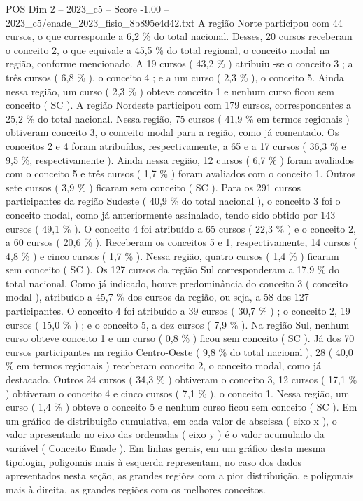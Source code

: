 \begin{textsample}{POS Dim 2 – 2023\_c5 – Score -1.00 – 2023\_c5/enade\_2023\_fisio\_8b895e4d42.txt}
A região Norte participou com 44 cursos, o que corresponde a 6,2 \% do total nacional.
Desses, 20 cursos receberam o conceito 2, o que equivale a 45,5 \% do total regional, o conceito modal na região, conforme mencionado.
A 19 cursos ( 43,2 \% ) atribuiu -se o conceito 3 ; a três cursos ( 6,8 \% ), o conceito 4 ; e a um curso ( 2,3 \% ), o conceito 5.
Ainda nessa região, um curso ( 2,3 \% ) obteve conceito 1 e nenhum curso ficou sem conceito ( SC ).
A região Nordeste participou com 179 cursos, correspondentes a 25,2 \% do total nacional.
Nessa região, 75 cursos ( 41,9 \% em termos regionais ) obtiveram conceito 3, o conceito modal para a região, como já comentado.
Os conceitos 2 e 4 foram atribuídos, respectivamente, a 65 e a 17 cursos ( 36,3 \% e 9,5 \%, respectivamente ).
Ainda nessa região, 12 cursos ( 6,7 \% ) foram avaliados com o conceito 5 e três cursos ( 1,7 \% ) foram avaliados com o conceito 1.
Outros sete cursos ( 3,9 \% ) ficaram sem conceito ( SC ).
Para os 291 cursos participantes da região Sudeste ( 40,9 \% do total nacional ), o conceito 3 foi o conceito modal, como já anteriormente assinalado, tendo sido obtido por 143 cursos ( 49,1 \% ).
O conceito 4 foi atribuído a 65 cursos ( 22,3 \% ) e o conceito 2, a 60 cursos ( 20,6 \% ).
Receberam os conceitos 5 e 1, respectivamente, 14 cursos ( 4,8 \% ) e cinco cursos ( 1,7 \% ).
Nessa região, quatro cursos ( 1,4 \% ) ficaram sem conceito ( SC ).
Os 127 cursos da região Sul corresponderam a 17,9 \% do total nacional.
Como já indicado, houve predominância do conceito 3 ( conceito modal ), atribuído a 45,7 \% dos cursos da região, ou seja, a 58 dos 127 participantes.
O conceito 4 foi atribuído a 39 cursos ( 30,7 \% ) ; o conceito 2, 19 cursos ( 15,0 \% ) ; e o conceito 5, a dez cursos ( 7,9 \% ).
Na região Sul, nenhum curso obteve conceito 1 e um curso ( 0,8 \% ) ficou sem conceito ( SC ).
Já dos 70 cursos participantes na região Centro-Oeste ( 9,8 \% do total nacional ), 28 ( 40,0 \% em termos regionais ) receberam conceito 2, o conceito modal, como já destacado.
Outros 24 cursos ( 34,3 \% ) obtiveram o conceito 3, 12 cursos ( 17,1 \% ) obtiveram o conceito 4 e cinco cursos ( 7,1 \% ), o conceito 1.
Nessa região, um curso ( 1,4 \% ) obteve o conceito 5 e nenhum curso ficou sem conceito ( SC ).
Em um gráfico de distribuição cumulativa, em cada valor de abscissa ( eixo x ), o valor apresentado no eixo das ordenadas ( eixo y ) é o valor acumulado da variável ( Conceito Enade ).
Em linhas gerais, em um gráfico desta mesma tipologia, poligonais mais à esquerda representam, no caso dos dados apresentados nesta seção, as grandes regiões com a pior distribuição, e poligonais mais à direita, as grandes regiões com os melhores conceitos.

\end{textsample}
